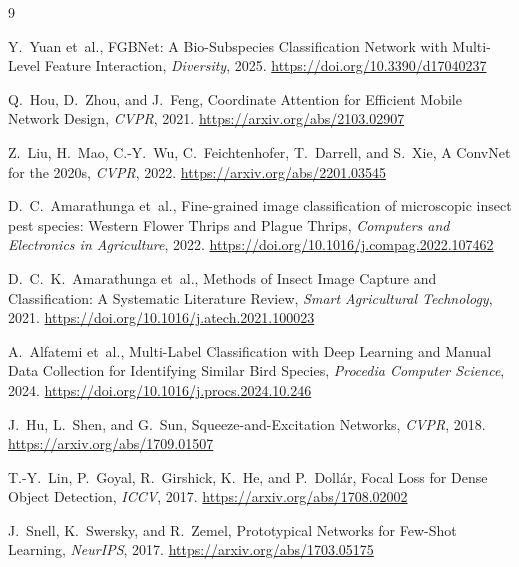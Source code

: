 \documentclass[10pt, twocolumn]{article}
\begin{document}
\begin{thebibliography}{9}

Y.~Yuan et~al.,
\newblock FGBNet: A Bio-Subspecies Classification Network with Multi-Level Feature Interaction,
\newblock \emph{Diversity}, 2025.
\newblock \url{https://doi.org/10.3390/d17040237}

Q.~Hou, D.~Zhou, and J.~Feng,
\newblock Coordinate Attention for Efficient Mobile Network Design,
\newblock \emph{CVPR}, 2021.
\newblock \url{https://arxiv.org/abs/2103.02907}

Z.~Liu, H.~Mao, C.-Y.~Wu, C.~Feichtenhofer, T.~Darrell, and S.~Xie,
\newblock A ConvNet for the 2020s,
\newblock \emph{CVPR}, 2022.
\newblock \url{https://arxiv.org/abs/2201.03545}

D.~C.~Amarathunga et~al.,
\newblock Fine-grained image classification of microscopic insect pest species: Western Flower Thrips and Plague Thrips,
\newblock \emph{Computers and Electronics in Agriculture}, 2022.
\newblock \url{https://doi.org/10.1016/j.compag.2022.107462}

D.~C.~K.~Amarathunga et~al.,
\newblock Methods of Insect Image Capture and Classification: A Systematic Literature Review,
\newblock \emph{Smart Agricultural Technology}, 2021.
\newblock \url{https://doi.org/10.1016/j.atech.2021.100023}

A.~Alfatemi et~al.,
\newblock Multi-Label Classification with Deep Learning and Manual Data Collection for Identifying Similar Bird Species,
\newblock \emph{Procedia Computer Science}, 2024.
\newblock \url{https://doi.org/10.1016/j.procs.2024.10.246}

J.~Hu, L.~Shen, and G.~Sun,
\newblock Squeeze-and-Excitation Networks,
\newblock \emph{CVPR}, 2018.
\newblock \url{https://arxiv.org/abs/1709.01507}

T.-Y.~Lin, P.~Goyal, R.~Girshick, K.~He, and P.~Doll{\'a}r,
\newblock Focal Loss for Dense Object Detection,
\newblock \emph{ICCV}, 2017.
\newblock \url{https://arxiv.org/abs/1708.02002}

J.~Snell, K.~Swersky, and R.~Zemel,
\newblock Prototypical Networks for Few-Shot Learning,
\newblock \emph{NeurIPS}, 2017.
\newblock \url{https://arxiv.org/abs/1703.05175}

\end{thebibliography}
\end{document}
